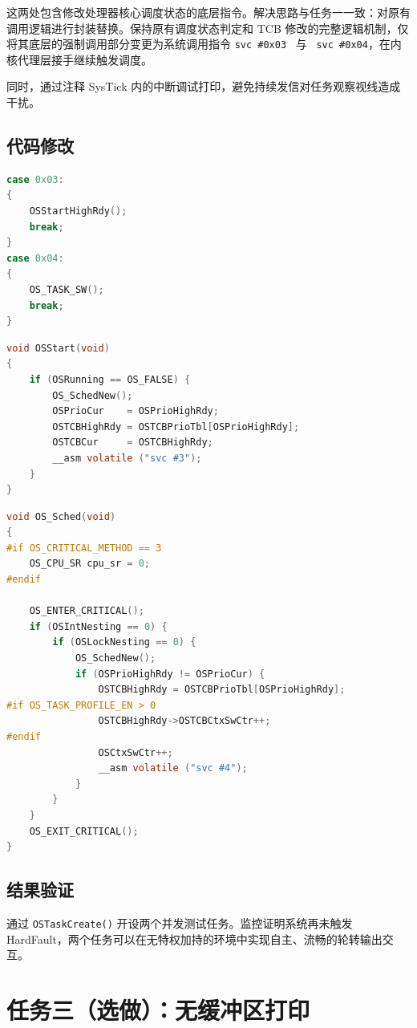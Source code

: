 \documentclass[UTF8]{ctexart}
\begin{document}
这两处包含修改处理器核心调度状态的底层指令。解决思路与任务一一致：对原有调用逻辑进行封装替换。保持原有调度状态判定和 TCB 修改的完整逻辑机制，仅将其底层的强制调用部分变更为系统调用指令 \texttt{svc \#0x03} \ 与 \ \texttt{svc \#0x04}，在内核代理层接手继续触发调度。

同时，通过注释 SysTick 内的中断调试打印，避免持续发信对任务观察视线造成干扰。

\subsection{代码修改}
\begin{lstlisting}[language=C, caption=SVC\_Handler\_Main 中任务二调用分发]
case 0x03:
{
    OSStartHighRdy();
    break;
}
case 0x04:
{
    OS_TASK_SW();
    break;
}
\end{lstlisting}

\begin{lstlisting}[language=C, caption=os\_core.c 中 OSStart 的修改]
void OSStart(void)
{
    if (OSRunning == OS_FALSE) {
        OS_SchedNew();
        OSPrioCur    = OSPrioHighRdy;
        OSTCBHighRdy = OSTCBPrioTbl[OSPrioHighRdy];
        OSTCBCur     = OSTCBHighRdy;
        __asm volatile ("svc #3");
    }
}
\end{lstlisting}

\begin{lstlisting}[language=C, caption=os\_time.c 中 OS\_Sched 的修改]
void OS_Sched(void)
{
#if OS_CRITICAL_METHOD == 3
    OS_CPU_SR cpu_sr = 0;
#endif

    OS_ENTER_CRITICAL();
    if (OSIntNesting == 0) {
        if (OSLockNesting == 0) {
            OS_SchedNew();
            if (OSPrioHighRdy != OSPrioCur) {
                OSTCBHighRdy = OSTCBPrioTbl[OSPrioHighRdy];
#if OS_TASK_PROFILE_EN > 0
                OSTCBHighRdy->OSTCBCtxSwCtr++;
#endif
                OSCtxSwCtr++;
                __asm volatile ("svc #4");
            }
        }
    }
    OS_EXIT_CRITICAL();
}
\end{lstlisting}

\subsection{结果验证}
通过 \texttt{OSTaskCreate()} 开设两个并发测试任务。监控证明系统再未触发 HardFault，两个任务可以在无特权加持的环境中实现自主、流畅的轮转输出交互。

\section{任务三（选做）：无缓冲区打印}
\end{document}
